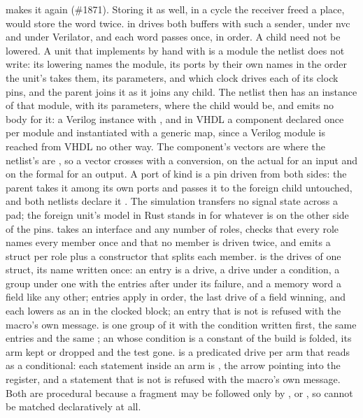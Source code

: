 makes it again (\#1871).
Storing it as well, in a cycle the receiver freed a place, would store
the word twice.
 in  drives both buffers with such
a sender, under nvc and under Verilator, and each word passes once, in
order.
A child need not be lowered. A unit that implements  by
hand with  is a module the netlist does not
write: its lowering names the module, its ports by their own names in
the order the unit's  takes them, its parameters, and which
clock drives each of its clock pins, and the parent joins it as it
joins any child. The netlist then has an instance of that module,
with its parameters, where the child would be, and emits no body for
it: a Verilog instance with , and in VHDL a component
declared once per module and instantiated with a generic map, since a
Verilog module is reached from VHDL no other way. The component's
vectors are  where the netlist's are
, so a vector crosses with a conversion, on the actual
for an input and on the formal for an output. A port of kind
 is a pin driven from both sides: the parent takes it among
its own ports and passes it to the foreign child untouched, and both
netlists declare it . The simulation transfers no signal state
across a pad; the foreign unit's model in Rust stands in for whatever is on
the other side of the pins.
 takes an interface and any number of roles, checks
that every role names every member once and that no member is driven
twice, and emits a struct per role plus a constructor that splits each
member.  is the drives of one struct,
its name written once: an entry  is a drive,
 a drive under a condition,  a group under one with the entries after
 under its failure, and a memory word  a
field like any other; entries apply in order, the last drive of a
field winning, and each lowers as an  in the clocked block;
an entry that is not  is refused with the macro's
own message.  is one
group of it with the condition written first, the same entries and
the same ; an  whose condition is a constant of
the build is folded, its arm kept or dropped and the test gone.  is a predicated drive per arm that reads
as a conditional: each statement inside an arm is , the arrow pointing into the register, and a statement that
is not is refused with the macro's own message. Both are procedural
because a   fragment may be followed
only by \code{=>}, \code{,} or \code{;}, so  cannot be
matched declaratively at all.

